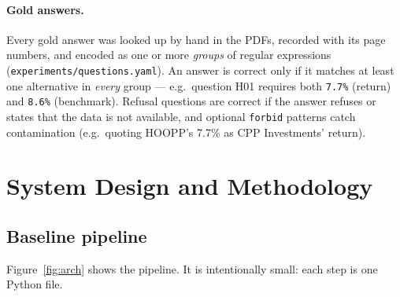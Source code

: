 \documentclass[11pt,a4paper]{article}
\begin{document}
\paragraph{Gold answers.}
Every gold answer was looked up by hand in the PDFs, recorded with its page numbers, and encoded as one or more
\emph{groups} of regular expressions (\nolinkurl{experiments/questions.yaml}). An answer is correct only if it matches
at least one alternative in \emph{every} group --- e.g.\ question H01 requires both \texttt{7.7\%} (return) and
\texttt{8.6\%} (benchmark). Refusal questions are correct if the answer refuses or states that the data is not
available, and optional \texttt{forbid} patterns catch contamination (e.g.\ quoting HOOPP's 7.7\% as CPP
Investments' return).

\section{System Design and Methodology}
\label{sec:design}

\subsection{Baseline pipeline}
Figure~\ref{fig:arch} shows the pipeline. It is intentionally small: each step is one Python file.
\end{document}

